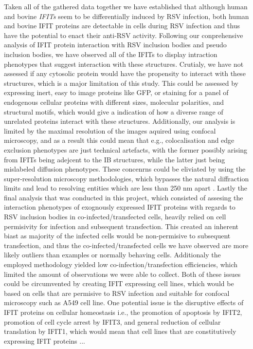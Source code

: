 Taken all of the gathered data together we have established that although human and bovine \textit{IFITs} seem to be differentially induced by RSV infection, both human and bovine IFIT proteins are detectable in cells during RSV infection and thus have the potential to enact their anti-RSV activity. Following our conprehensive analysis of IFIT protein interaction with RSV inclusion bodies and pseudo inclusion bodies, we have observed all of the IFITs to display intraction phenotypes that suggest interaction with these structures. Crutialy, we have not assessed if any cytosolic protein would have the propensity to interact with these structures, which is a major limitation of this study. This could be assessed by expressing inert, easy to image proteins like GFP, or staining for a panel of endogenous cellular proteins with different sizes, molecular polarities, and structural motifs, which would give a indication of how a diverse range of unrelated proteins interact with these structures. Additionally, our analysis is limited by the maximal resolution of the images aquired using confocal microscopy, and as a result this could mean that e.g., colocalisation and edge exclusion phenotypes are just technical artefacts, with the former possibly arising from IFITs being adejcent to the IB structures, while the latter just being mislabeled diffusion phenotypes. These concenrns could be eliviated by using the super-resolution microscopy methodologies, which bypasses the natural diffraction limits and lead to resolving entities which are less than 250 nm apart \cite{Schermelleh2019Super-resolutionDemystified}. Lastly the final analysis that was conducted in this project, which consisted of assesing the interaction phenotypes of exognously expressed IFIT proteins with regards to RSV inclusion bodies in co-infected/transfected cells, heavily relied on cell permisivity for infection and subsequent transfection. This created an inherent biast as majority of the infected cells would be non-permisive to subsequent transfection, and thus the co-infected/transfected cells we have observed are more likely outliers than examples or normally behaving cells. Additionaly the employed methodology yielded low co-infection/transfection efficiencies, which limited the amount of observations we were able to collect. Both of these issues could be circumvented by creating IFIT expressing cell lines, which would be based on cells that are permisive to RSV infection and suitable for confocal microscopy such as A549 cell line. One potential issue is the disruptive effects of IFIT proteins on cellular homeostasis i.e., the promotion of apoptosis by IFIT2, promotion of cell cycle arrest by IFIT3, and general reduction of cellular translation by IFIT1, which would mean that cell lines that are constitutively expressing IFIT proteins ... \cite{Kallunki2019HowStudies}


